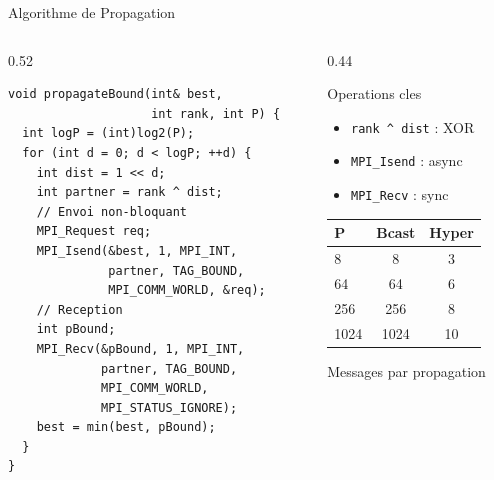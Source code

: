\documentclass[aspectratio=169,9pt]{beamer}
\begin{document}
\begin{frame}[fragile]{Algorithme de Propagation}
    \begin{columns}[T]
        \begin{column}{0.52\textwidth}
\begin{lstlisting}
void propagateBound(int& best,
                    int rank, int P) {
  int logP = (int)log2(P);
  for (int d = 0; d < logP; ++d) {
    int dist = 1 << d;
    int partner = rank ^ dist;
    // Envoi non-bloquant
    MPI_Request req;
    MPI_Isend(&best, 1, MPI_INT,
              partner, TAG_BOUND,
              MPI_COMM_WORLD, &req);
    // Reception
    int pBound;
    MPI_Recv(&pBound, 1, MPI_INT,
             partner, TAG_BOUND,
             MPI_COMM_WORLD,
             MPI_STATUS_IGNORE);
    best = min(best, pBound);
  }
}
\end{lstlisting}
        \end{column}
        \begin{column}{0.44\textwidth}
            \begin{block}{Operations cles}
                \small
                \begin{itemize}
                    \item \texttt{rank \^{} dist} : XOR
                    \item \texttt{MPI\_Isend} : async
                    \item \texttt{MPI\_Recv} : sync
                \end{itemize}
            \end{block}
            \vspace{0.2cm}
            \small
            \begin{tabular}{lcc}
                \toprule
                \textbf{P} & \textbf{Bcast} & \textbf{Hyper} \\
                \midrule
                8 & 8 & 3 \\
                64 & 64 & 6 \\
                256 & 256 & 8 \\
                1024 & 1024 & 10 \\
                \bottomrule
            \end{tabular}
            \vspace{0.1cm}
            {\footnotesize Messages par propagation}
        \end{column}
    \end{columns}
\end{frame}
\end{document}
